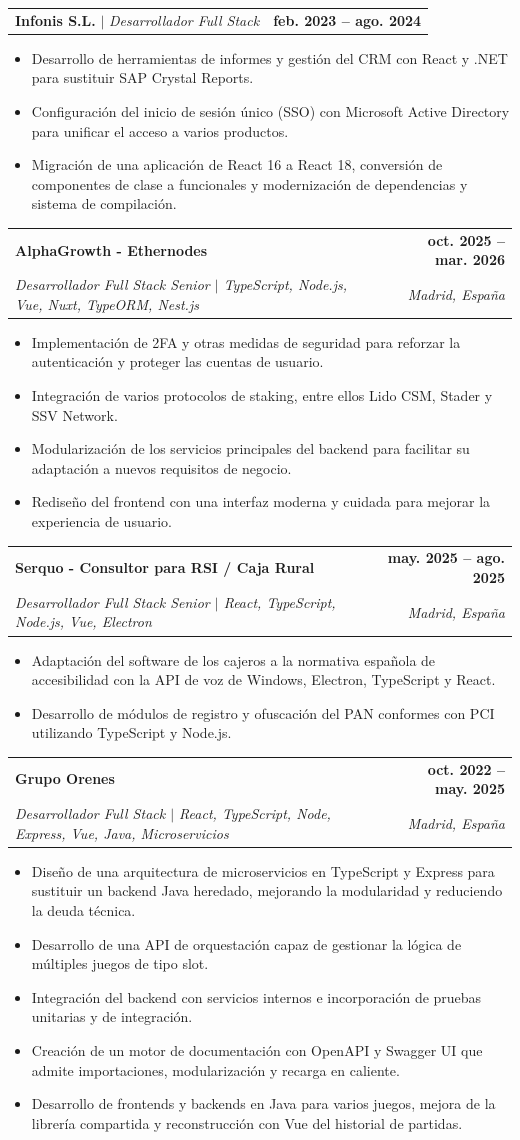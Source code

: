 \documentclass[letterpaper,11pt]{article}
\makeatletter
\newcommand{\resumeItem}[1]{
  \item\small{
    {#1 \vspace{-2pt}}
  }
}
\newcommand{\resumeSubheading}[4]{
  \vspace{-2pt}\item
    \begin{tabular*}{1.0\textwidth}[t]{l@{\extracolsep{\fill}}r}
      \textbf{#1} & \textbf{\small #2} \\
      \textit{\small#3} & \textit{\small #4} \\
    \end{tabular*}\vspace{-7pt}
}
\newcommand{\resumeContractHeading}[2]{
    \vspace{4pt}
    \hspace{0.3in}\begin{tabular*}{0.95\textwidth}{l@{\extracolsep{\fill}}r}
      \small#1 & \textbf{\small #2}\\
    \end{tabular*}\vspace{-5pt}
}
\newcommand{\resumeContractItem}[1]{\item\small{#1}}
\newcommand{\resumeContractItemListStart}{\begin{itemize}[leftmargin=0.6in, rightmargin=0.1in, nosep]}
\newcommand{\resumeContractItemListEnd}{\end{itemize}\vspace{-1pt}}
\newcommand{\resumeItemListStart}{\begin{itemize}[itemsep=0pt, parsep=0pt, topsep=2pt]}
\newcommand{\resumeItemListEnd}{\end{itemize}\vspace{-5pt}}
\makeatother
\begin{document}
      \resumeContractHeading
          {\textbf{Infonis S.L.} $|$ \emph{Desarrollador Full Stack}}{feb. 2023 -- ago. 2024}
      \resumeContractItemListStart
        \resumeContractItem{Desarrollo de herramientas de informes y gestión del CRM con React y .NET para sustituir SAP Crystal Reports.}
        \resumeContractItem{Configuración del inicio de sesión único (SSO) con Microsoft Active Directory para unificar el acceso a varios productos.}
        \resumeContractItem{Migración de una aplicación de React 16 a React 18, conversión de componentes de clase a funcionales y modernización de dependencias y sistema de compilación.}
      \resumeContractItemListEnd

    \resumeSubheading
      {AlphaGrowth - Ethernodes}{oct. 2025 -- mar. 2026}
      {Desarrollador Full Stack Senior $|$ TypeScript, Node.js, Vue, Nuxt, TypeORM, Nest.js}{Madrid, España}
      \resumeItemListStart
        \resumeItem{Implementación de 2FA y otras medidas de seguridad para reforzar la autenticación y proteger las cuentas de usuario.}
        \resumeItem{Integración de varios protocolos de staking, entre ellos Lido CSM, Stader y SSV Network.}
        \resumeItem{Modularización de los servicios principales del backend para facilitar su adaptación a nuevos requisitos de negocio.}
        \resumeItem{Rediseño del frontend con una interfaz moderna y cuidada para mejorar la experiencia de usuario.}
      \resumeItemListEnd
    \resumeSubheading
      {Serquo - Consultor para RSI / Caja Rural}{may. 2025 -- ago. 2025}
      {Desarrollador Full Stack Senior $|$ React, TypeScript, Node.js, Vue, Electron}{Madrid, España}
      \resumeItemListStart
        \resumeItem{Adaptación del software de los cajeros a la normativa española de accesibilidad con la API de voz de Windows, Electron, TypeScript y React.}
        \resumeItem{Desarrollo de módulos de registro y ofuscación del PAN conformes con PCI utilizando TypeScript y Node.js.}
      \resumeItemListEnd

    \resumeSubheading
      {Grupo Orenes}{oct. 2022 -- may. 2025}
      {Desarrollador Full Stack $|$ React, TypeScript, Node, Express, Vue, Java, Microservicios}{Madrid, España}
      \resumeItemListStart
        \resumeItem{Diseño de una arquitectura de microservicios en TypeScript y Express para sustituir un backend Java heredado, mejorando la modularidad y reduciendo la deuda técnica.}
        \resumeItem{Desarrollo de una API de orquestación capaz de gestionar la lógica de múltiples juegos de tipo slot.}
        \resumeItem{Integración del backend con servicios internos e incorporación de pruebas unitarias y de integración.}
        \resumeItem{Creación de un motor de documentación con OpenAPI y Swagger UI que admite importaciones, modularización y recarga en caliente.}
        \resumeItem{Desarrollo de frontends y backends en Java para varios juegos, mejora de la librería compartida y reconstrucción con Vue del historial de partidas.}
      \resumeItemListEnd
    
\end{document}
